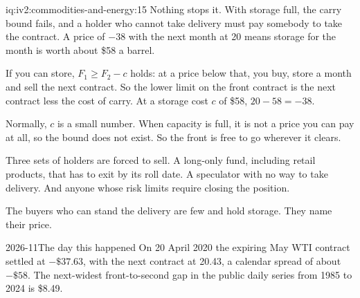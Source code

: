 \begin{solution}{iq:iv2:commodities-and-energy:15}
Nothing stops it. With storage full, the carry bound fails, and a holder who cannot take delivery must pay somebody to take the contract. A price of $-38$ with the next month at 20 means storage for the month is worth about \$58 a barrel.

If you can store, $F_1 \ge F_2 - c$ holds: at a price below that, you buy, store a month and sell the next contract. So the lower limit on the front contract is the next contract less the cost of carry. At a storage cost $c$ of \$58, $20 - 58 = -38$.

Normally, $c$ is a small number. When capacity is full, it is not a price you can pay at all, so the bound does not exist. So the front is free to go wherever it clears.

Three sets of holders are forced to sell. A long-only fund, including retail products, that has to exit by its roll date. A speculator with no way to take delivery. And anyone whose risk limits require closing the position.

The buyers who can stand the delivery are few and hold storage. They name their price.

\begin{dated}{2026-11}{The day this happened}\label{dat:iv2:commodities-and-energy:neg-wti}
On 20 April 2020 the expiring May WTI contract settled at $-\$37.63$, with the next contract at 20.43, a calendar spread of about $-\$58$. The next-widest front-to-second gap in the public daily series from 1985 to 2024 is \$8.49.
\end{dated}

\end{solution}

